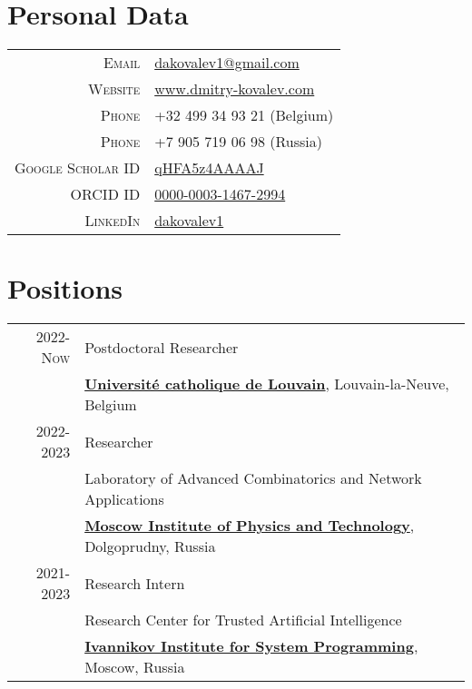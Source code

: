 \section{Personal Data}

\begin{tabular}{rl}
	\textsc{Email} & \href{mailto:dakovalev1@gmail.com}{dakovalev1@gmail.com}\\
	\textsc{Website} & \href{https://www.dmitry-kovalev.com}{www.dmitry-kovalev.com}\\
	\textsc{Phone} &  +32 499 34 93 21 (Belgium)\\
	\textsc{Phone} & +7 905 719 06 98 (Russia)\\
	\textsc{Google Scholar ID} &\href{https://scholar.google.com/citations?user=qHFA5z4AAAAJ}{qHFA5z4AAAAJ}\\
	\textsc{ORCID ID} & \href{https://orcid.org/0000-0003-1467-2994}{0000-0003-1467-2994}\\
	\textsc{LinkedIn} & \href{https://www.linkedin.com/in/dakovalev1/}{dakovalev1}

\end{tabular}



\section{Positions}
\begin{tabular}{rl}	
	\textsc{2022-Now}& Postdoctoral Researcher\\
	& \textbf{\href{https://uclouvain.be/en/index.html}{\color{black}Université catholique de Louvain}}, Louvain-la-Neuve, Belgium\\
	\textsc{2022-2023}& Researcher\\
	&Laboratory of Advanced Combinatorics and Network Applications\\
	&\textbf{\href{https://mipt.ru/}{\color{black}Moscow Institute of Physics and Technology}}, Dolgoprudny, Russia\\
	\textsc{2021-2023}& Research Intern\\
	 &Research Center for Trusted Artificial Intelligence\\
	 &\textbf{\href{https://www.ispras.ru/en/}{\color{black}Ivannikov Institute for System Programming}}, Moscow, Russia
\end{tabular}


